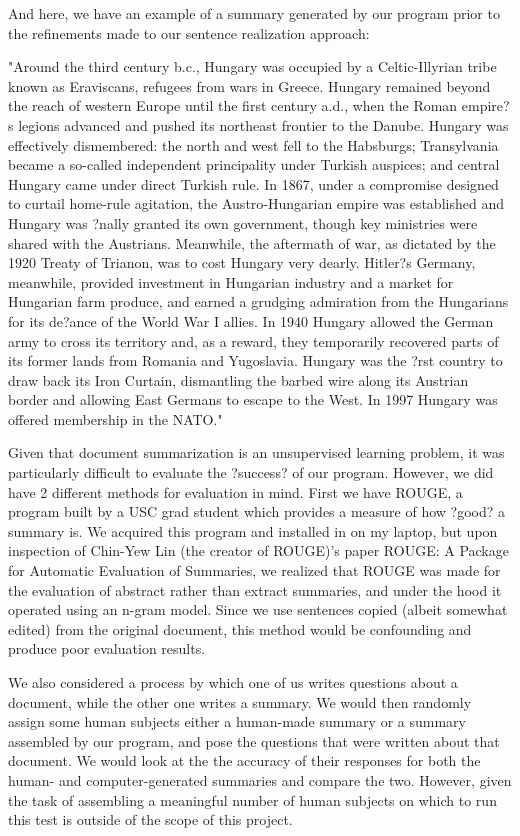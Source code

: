 \documentclass[12pt]{article}
\theoremstyle{plain}
\theoremstyle{definition}
\theoremstyle{remark}
\theoremstyle{plain}
\begin{document}
	And here, we have an example of a summary generated by our program prior to the refinements made to our sentence realization approach: 
	\begin{center}
	
"Around the third century b.c., Hungary was occupied by a Celtic-Illyrian tribe known as Eraviscans, refugees from wars in Greece. Hungary remained beyond the reach of western Europe until the first century a.d., when the Roman empire?s legions advanced and pushed its northeast frontier to the Danube. Hungary was effectively dismembered: the north and west fell to the Habsburgs; Transylvania became a so-called independent principality under Turkish auspices; and central Hungary came under direct Turkish rule. In 1867, under a compromise designed to curtail home-rule agitation, the Austro-Hungarian empire was established and Hungary was ?nally granted its own government, though key ministries were shared with the Austrians. Meanwhile, the aftermath of war, as dictated by the 1920 Treaty of Trianon, was to cost Hungary very dearly. Hitler?s Germany, meanwhile, provided investment in Hungarian industry and a market for Hungarian farm produce, and earned a grudging admiration from the Hungarians for its de?ance of the World War I allies. In 1940 Hungary allowed the German army to cross its territory and, as a reward, they temporarily recovered parts of its former lands from Romania and Yugoslavia. Hungary was the ?rst country to draw back its Iron Curtain, dismantling the barbed wire along its Austrian border and allowing East Germans to escape to the West. In 1997 Hungary was offered membership in the NATO."

	\end{center}

	Given that document summarization is an unsupervised learning problem, it was particularly difficult to evaluate the ?success? of our program. However, we did have 2 different methods for evaluation in mind. First we have ROUGE, a program built by a USC grad student which provides a measure of how ?good? a summary is. We acquired this program and installed in on my laptop, but upon inspection of Chin-Yew Lin (the creator of ROUGE)'s paper ROUGE: A Package for Automatic Evaluation of Summaries, we realized that ROUGE was made for the evaluation of abstract rather than extract summaries, and under the hood it operated using an n-gram model. Since we use sentences copied (albeit somewhat edited) from the original document, this method would be confounding and produce poor evaluation results.
	
We also considered a process by which one of us writes questions about a document, while the other one writes a summary. We would then randomly assign some human subjects either a human-made summary or a summary assembled by our program, and pose the questions that were written about that document. We would look at the the accuracy of their responses for both the human- and computer-generated summaries and compare the two. However, given the task of assembling a meaningful number of human subjects on which to run this test is outside of the scope of this project.
\end{document}
